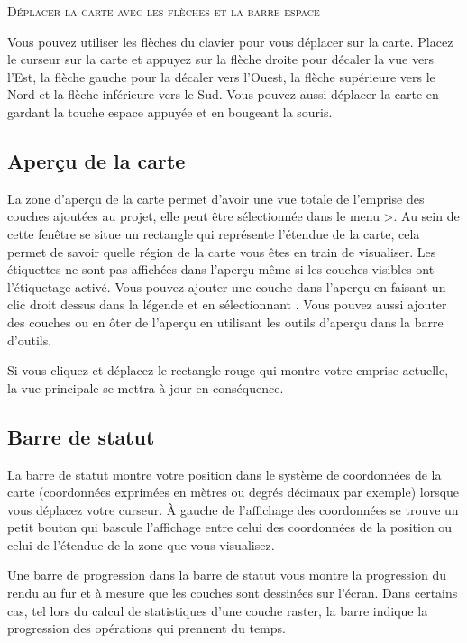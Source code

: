 \begin{Tip} \caption{\textsc{Déplacer la carte avec les flèches et la barre espace}} 
Vous pouvez utiliser les flèches du clavier pour vous déplacer sur la carte. Placez le curseur sur la carte et appuyez sur la flèche droite pour décaler la vue vers l'Est, la flèche gauche pour la décaler vers l'Ouest, la flèche supérieure vers le Nord et la flèche inférieure vers le Sud. Vous pouvez aussi déplacer la carte en gardant la touche espace appuyée et en bougeant la souris.
\end{Tip}

\subsection{Aperçu de la carte} \label{label_mapoverview}

La zone d'aperçu de la carte permet d'avoir une vue totale de l'emprise des couches ajoutées au projet, elle peut être sélectionnée dans le menu >. Au sein de cette fenêtre se situe un rectangle qui représente l'étendue de la carte, cela permet de savoir quelle région de la carte vous êtes en train de visualiser. Les étiquettes ne sont pas affichées dans l'aperçu même si les couches visibles ont l'étiquetage activé.
Vous pouvez ajouter une couche dans l'aperçu en faisant un clic droit dessus dans la légende et en sélectionnant . Vous pouvez aussi ajouter des couches ou en ôter de l'aperçu en utilisant les outils d'aperçu dans la barre d'outils.

Si vous cliquez et déplacez le rectangle rouge qui montre votre emprise actuelle, la vue principale se mettra à jour en conséquence.

\subsection{Barre de statut} \label{label_statusbar}

La barre de statut montre votre position dans le système de coordonnées de la carte (coordonnées exprimées en mètres ou degrés décimaux par exemple) lorsque vous déplacez votre curseur. À gauche de l'affichage des coordonnées se trouve un petit bouton qui bascule l'affichage entre celui des coordonnées de la position ou celui de l'étendue de la zone que vous visualisez.

Une barre de progression dans la barre de statut vous montre la progression du rendu au fur et à mesure que les couches sont dessinées sur l'écran. Dans certains cas, tel lors du calcul de statistiques d'une couche raster, la barre indique la progression des opérations qui prennent du temps.

